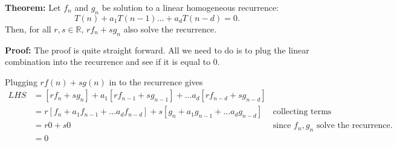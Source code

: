 \documentclass[a4paper, 12pt]{article}
\newcommand{\real}{\mathbb{R}}
\newcommand{\theorem}{\vspace{1em}\noindent\textbf{Theorem:} }
\renewcommand{\proof}{\vspace{0.5em}\noindent\textbf{Proof:} }
\begin{document}
\theorem Let $f_n$ and $g_n$ be solution to a linear homogeneous recurrence:
\[
T(n) + a_1 T(n-1) \ldots +a_d T(n-d) = 0.
\]
Then, for all $r,s \in \real$, $r f_n + s g_n$ also solve the recurrence.

\proof The proof is quite straight forward. All we need to do is to plug the linear combination into the recurrence and see if it is equal to 0.

Plugging $r f(n) + s g(n)$ in to the recurrence gives
\begin{align*}
	LHS &= [r f_n + s g_n ] + a_1 [r f_{n-1} + s g_{n-1} ] + \ldots a_d [r f_{n-d} + s g_{n-d} ]\\
	& = r[f_n + a_1 f_{n-1} + \ldots a_df_{n-d}] + s[g_n + a_1 g_{n-1} + \ldots a_dg_{n-d}] & \text{collecting terms}\\
	& = r 0 + s 0 & \text{since $f_n,g_n$ solve the recurrence.}\\
	&=0
\end{align*}
\end{document}
